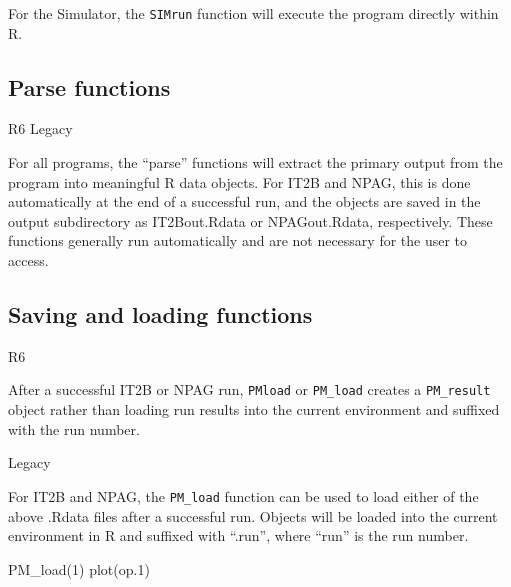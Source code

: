 \documentclass[
]{book}
\newenvironment{Shaded}{\begin{snugshade}}{\end{snugshade}}
\newcommand{\DecValTok}[1]{\textcolor[rgb]{0.00,0.00,0.81}{#1}}
\newcommand{\FloatTok}[1]{\textcolor[rgb]{0.00,0.00,0.81}{#1}}
\newcommand{\FunctionTok}[1]{\textcolor[rgb]{0.00,0.00,0.00}{#1}}
\newcommand{\NormalTok}[1]{#1}
\newcommand{\OtherTok}[1]{\textcolor[rgb]{0.56,0.35,0.01}{#1}}
\newcommand{\SpecialCharTok}[1]{\textcolor[rgb]{0.00,0.00,0.00}{#1}}
\begin{document}
For the Simulator, the \texttt{SIMrun} function will execute the program
directly within R.

\hypertarget{parse-functions}{%
\subsection{Parse functions}\label{parse-functions}}

{R6} {Legacy}

For all programs, the ``parse'' functions will extract the primary output
from the program into meaningful R data objects. For IT2B and NPAG, this
is done automatically at the end of a successful run, and the objects
are saved in the output subdirectory as IT2Bout.Rdata or NPAGout.Rdata,
respectively. These functions generally run automatically and are not
necessary for the user to access.

\hypertarget{saving-and-loading-functions}{%
\subsection{Saving and loading functions}\label{saving-and-loading-functions}}

{R6}

After a successful IT2B or NPAG run, \texttt{PMload} or \texttt{PM\_load} creates a
\texttt{PM\_result} object rather than loading run results into the current
environment and suffixed with the run number.

\begin{Shaded}
\end{Shaded}

{Legacy}

For IT2B and NPAG, the \texttt{PM\_load} function can be used to load either
of the above .Rdata files after a successful run. Objects will be loaded
into the current environment in R and suffixed with ``.run'', where ``run'' is
the run number.

\begin{Shaded}
\begin{Highlighting}[]
\FunctionTok{PM\_load}\NormalTok{(}\DecValTok{1}\NormalTok{)}
\FunctionTok{plot}\NormalTok{(op}\FloatTok{.1}\NormalTok{)}
\end{Highlighting}
\end{Shaded}
\end{document}
